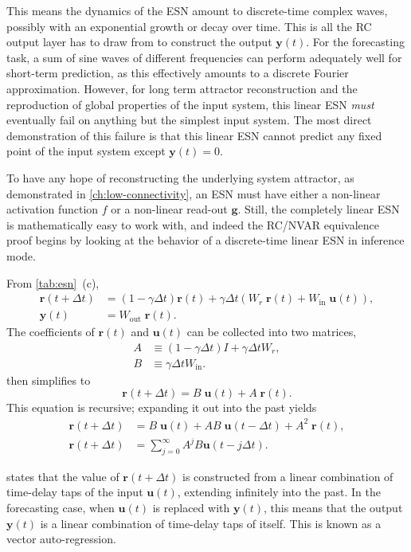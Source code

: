 This means the dynamics of the ESN amount to discrete-time complex
waves, possibly with an exponential growth or decay over time. This is
all the RC output layer has to draw from to construct the output
$\bm{y}(t)$. For the forecasting task, a sum of sine waves of
different frequencies can perform adequately well for short-term
prediction, as this effectively amounts to a discrete Fourier
approximation. However, for long term attractor reconstruction and the
reproduction of global properties of the input system, this linear ESN
\emph{must} eventually fail on anything but the simplest input
system. The most direct demonstration of this failure is that this
linear ESN cannot predict any fixed point of the input system except
$\bm{y}(t) = 0$.

To have any hope of reconstructing the underlying system attractor, as
demonstrated in \cref{ch:low-connectivity}, an ESN must have either a
non-linear activation function $f$ or a non-linear read-out
$\bm{g}$. Still, the completely linear ESN is mathematically easy to
work with, and indeed the RC/NVAR equivalence proof begins by looking
at the behavior of a discrete-time linear ESN in inference mode.

From \cref{tab:esn}~(c),
\begin{align}
  \bm{r}(t + \Delta t) &= (1 - \gamma \Delta t) \bm{r}(t) + \gamma \Delta t \left( W_r\;\bm{r}(t) + W_\text{in}\;\bm{u}(t) \right), \label{eq:nvar-esn} \\
  \bm{y}(t) &= W_\text{out}\;\bm{r}(t).
\end{align}
The coefficients of $\bm{r}(t)$ and $\bm{u}(t)$ can be collected into two matrices,
\begin{align}
  A &\equiv (1 - \gamma \Delta t) I + \gamma \Delta t W_r, \\
  B &\equiv \gamma \Delta t W_\text{in}.
\end{align}
 then simplifies to
\begin{equation}
  \bm{r}(t + \Delta t) = B\;\bm{u}(t) + A\;\bm{r}(t).
\end{equation}
This equation is recursive; expanding it out into the past yields
\begin{align}
  \bm{r}(t + \Delta t) &= B\;\bm{u}(t) + AB\;\bm{u}(t - \Delta t) + A^2\;\bm{r}(t), \\
  \bm{r}(t + \Delta t) &= \sum_{j = 0}^\infty A^j B \bm{u}(t - j \Delta t). \label{eq:esn-var-mat}
\end{align}

 states that the value of $\bm{r}(t + \Delta t)$
is constructed from a linear combination of time-delay taps of the
input $\bm{u}(t)$, extending infinitely into the past. In the
forecasting case, when $\bm{u}(t)$ is replaced with $\bm{y}(t)$, this
means that the output $\bm{y}(t)$ is a linear combination of
time-delay taps of itself. This is known as a vector
auto-regression.

